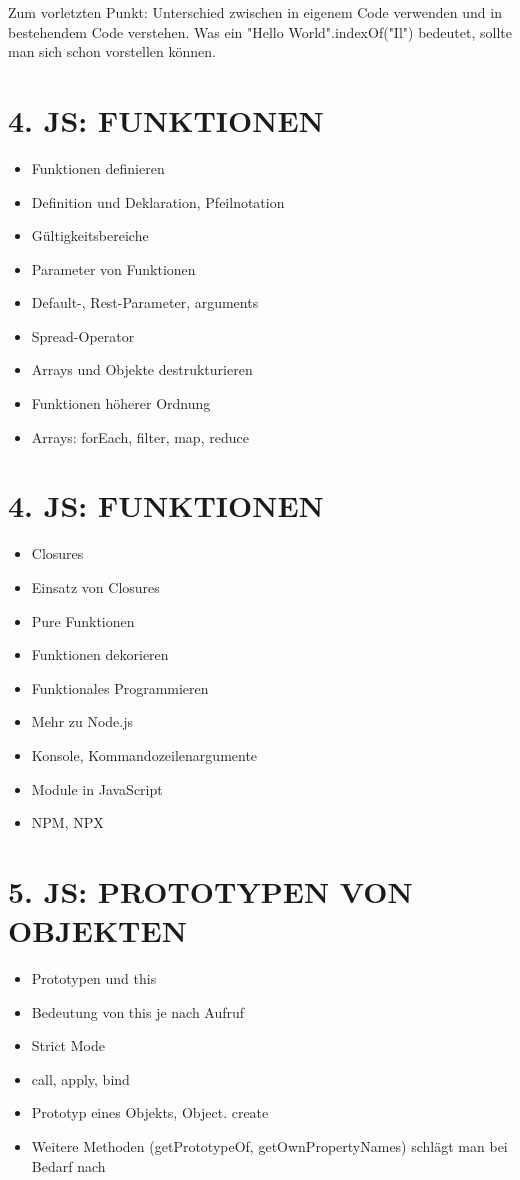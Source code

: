 Zum vorletzten Punkt: Unterschied zwischen in eigenem Code verwenden und in bestehendem Code verstehen. Was ein "Hello World".indexOf("Il") bedeutet, sollte man sich schon vorstellen können.

\section*{4. JS: FUNKTIONEN}
\begin{itemize}
  \item Funktionen definieren
  \item Definition und Deklaration, Pfeilnotation
  \item Gültigkeitsbereiche
  \item Parameter von Funktionen
  \item Default-, Rest-Parameter, arguments
  \item Spread-Operator
  \item Arrays und Objekte destrukturieren
  \item Funktionen höherer Ordnung
  \item Arrays: forEach, filter, map, reduce
\end{itemize}

\section*{4. JS: FUNKTIONEN}
\begin{itemize}
  \item Closures
  \item Einsatz von Closures
  \item Pure Funktionen
  \item Funktionen dekorieren
  \item Funktionales Programmieren
  \item Mehr zu Node.js
  \item Konsole, Kommandozeilenargumente
  \item Module in JavaScript
  \item NPM, NPX
\end{itemize}

\section*{5. JS: PROTOTYPEN VON OBJEKTEN}
\begin{itemize}
  \item Prototypen und this
  \item Bedeutung von this je nach Aufruf
  \item Strict Mode
  \item call, apply, bind
  \item Prototyp eines Objekts, Object. create
  \item Weitere Methoden (getPrototypeOf, getOwnPropertyNames) schlägt man bei Bedarf nach
\end{itemize}

